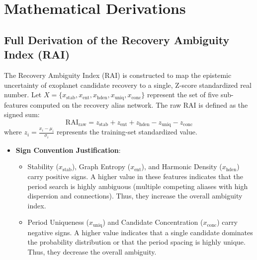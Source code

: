 \appendix

\section{Mathematical Derivations} \label{sec:app_math}

\subsection{Full Derivation of the Recovery Ambiguity Index (RAI)} \label{sec:app_rai_deriv}
The Recovery Ambiguity Index (RAI) is constructed to map the epistemic uncertainty of exoplanet candidate recovery to a single, Z-score standardized real number. Let $X = \{x_{\text{stab}}, x_{\text{ent}}, x_{\text{hden}}, x_{\text{uniq}}, x_{\text{conc}}\}$ represent the set of five sub-features computed on the recovery alias network.
The raw RAI is defined as the signed sum:
\begin{equation}
\text{RAI}_{\text{raw}} = z_{\text{stab}} + z_{\text{ent}} + z_{\text{hden}} - z_{\text{uniq}} - z_{\text{conc}}
\label{eq:app_raw_rai}
\end{equation}
where $z_i = \frac{x_i - \mu_i}{\sigma_i}$ represents the training-set standardized value.
\begin{itemize}
\item \textbf{Sign Convention Justification}:
  \begin{itemize}
  \item Stability ($x_{\text{stab}}$), Graph Entropy ($x_{\text{ent}}$), and Harmonic Density ($x_{\text{hden}}$) carry positive signs. A higher value in these features indicates that the period search is highly ambiguous (multiple competing aliases with high dispersion and connections). Thus, they increase the overall ambiguity index.
  \item Period Uniqueness ($x_{\text{uniq}}$) and Candidate Concentration ($x_{\text{conc}}$) carry negative signs. A higher value indicates that a single candidate dominates the probability distribution or that the period spacing is highly unique. Thus, they decrease the overall ambiguity.
  \end{itemize}
\end{itemize}

